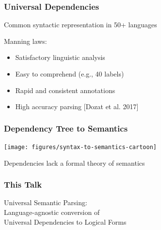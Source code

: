 \documentclass[mathserif,12pt]{beamer}
\begin{document}
\begin{frame}
\frametitle{Universal Dependencies}
\large

Common syntactic representation in 50+ languages

\vspace{2em}

Manning laws: 
\begin{itemize}
\item Satisfactory linguistic analysis

\vspace{1em}
\item Easy to comprehend (e.g., 40 labels)

\vspace{1em}
\item Rapid and consistent annotations

\vspace{1em}
\item High accuracy parsing {\footnotesize [Dozat et al. 2017]}
\end{itemize}
\end{frame}

\begin{frame}
\frametitle{Dependency Tree to Semantics}
\centering

\vspace{1em}

\texttt{[image: figures/syntax-to-semantics-cartoon]}

\vspace{2em}

\Large
 Dependencies \alert{lack} a formal theory of semantics
\end{frame}

\begin{frame}
 \frametitle{This Talk}
 \Large \centering

Universal Semantic Parsing:\\
Language-agnostic conversion of \\Universal Dependencies to Logical Forms
 
\end{frame}
\end{document}
